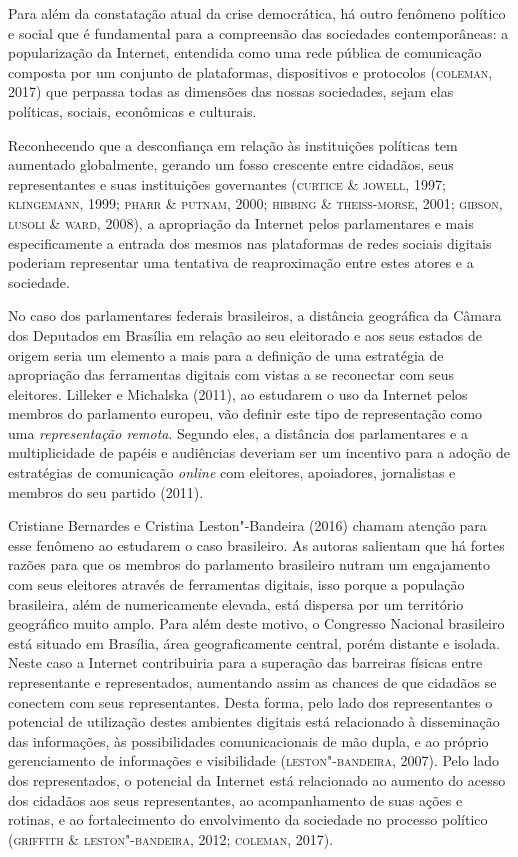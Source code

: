 Para além da constatação atual da crise democrática, há outro fenômeno
político e social que é fundamental para a compreensão das sociedades
contemporâneas: a popularização da Internet, entendida como uma rede
pública de comunicação composta por um conjunto de plataformas,
dispositivos e protocolos (\textsc{coleman}, 2017) que perpassa todas as
dimensões das nossas sociedades, sejam elas políticas, sociais,
econômicas e culturais.

Reconhecendo que a desconfiança em relação às instituições políticas tem
aumentado globalmente, gerando um fosso crescente entre cidadãos, seus
representantes e suas instituições governantes (\textsc{curtice \& jowell}, 1997;
\textsc{klingemann}, 1999; \textsc{pharr \& putnam}, 2000; \textsc{hibbing \& theiss-morse}, 2001;
\textsc{gibson, lusoli \& ward}, 2008), a apropriação da Internet pelos
parlamentares e mais especificamente a entrada dos mesmos nas
plataformas de redes sociais digitais poderiam representar uma tentativa
de reaproximação entre estes atores e a sociedade.

No caso dos parlamentares federais brasileiros, a distância geográfica
da Câmara dos Deputados em Brasília em relação ao seu eleitorado e aos
seus estados de origem seria um elemento a mais para a definição de uma
estratégia de apropriação das ferramentas digitais com vistas a se
reconectar com seus eleitores. Lilleker e Michalska (2011), ao estudarem
o uso da Internet pelos membros do parlamento europeu, vão definir este
tipo de representação como uma \emph{representação remota}. Segundo
eles, a distância dos parlamentares e a multiplicidade de papéis e
audiências deveriam ser um incentivo para a adoção de estratégias de
comunicação \emph{online} com eleitores, apoiadores, jornalistas e membros do
seu partido (2011).

Cristiane Bernardes e Cristina Leston"-Bandeira (2016) chamam atenção
para esse fenômeno ao estudarem o caso brasileiro. As autoras salientam
que há fortes razões para que os membros do parlamento brasileiro nutram
um engajamento com seus eleitores através de ferramentas digitais, isso
porque a população brasileira, além de numericamente elevada, está
dispersa por um território geográfico muito amplo. Para além deste
motivo, o Congresso Nacional brasileiro está situado em Brasília, área
geograficamente central, porém distante e isolada. Neste caso a Internet
contribuiria para a superação das barreiras físicas entre representante
e representados, aumentando assim as chances de que cidadãos se conectem
com seus representantes. Desta forma, pelo lado dos representantes o
potencial de utilização destes ambientes digitais está relacionado à
disseminação das informações, às possibilidades comunicacionais de mão
dupla, e ao próprio gerenciamento de informações e visibilidade
(\textsc{leston"-bandeira}, 2007). Pelo lado dos representados, o potencial da
Internet está relacionado ao aumento do acesso dos cidadãos aos seus
representantes, ao acompanhamento de suas ações e rotinas, e ao
fortalecimento do envolvimento da sociedade no processo político
(\textsc{griffith \& leston"-bandeira}, 2012; \textsc{coleman}, 2017).

